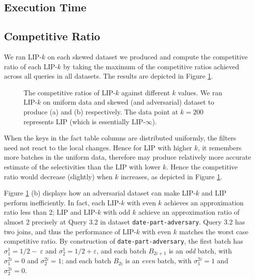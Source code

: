 \subsection{Execution Time}
\label{sec:time}



\subsection{Competitive Ratio}
\label{sec:ratio}

We ran LIP-$k$ on each skewed dataset we produced and compute the competitive ratio of each LIP-$k$ by taking the maximum of the competitive ratios achieved across all queries in all datasets. The results are depicted in Figure \ref{fig:cr}. 

\begin{figure}
    \centering
    \quad
    \caption{The competitive ratios of LIP-$k$ against different $k$ values. We ran LIP-$k$ on uniform data and skewed (and adversarial) dataset to produce (a) and (b) respectively. The data point at $k = 200$ represents LIP (which is essentially LIP-$\infty$).}
    \label{fig:cr}
\end{figure}

When the keys in the fact table columns are distributed uniformly, the filters need not react to the local changes. Hence for LIP with higher $k$, it remembers more batches in the uniform data, therefore may produce relatively more accurate estimate of the selectivities than the LIP with lower $k$. Hence the competitive ratio would decrease (slightly) when $k$ increases, as depicted in Figure \ref{fig:cr}.  

Figure \ref{fig:cr} (b) displays how an adversarial dataset can make LIP-$k$ and LIP perform inefficiently. In fact, each LIP-$k$ with even $k$ achieves an approximation ratio less than 2; LIP and LIP-$k$ with odd $k$ achieve an approximation ratio of almost 2 precisely at Query 3.2 in dataset \texttt{date-part-adversary}. Query 3.2 has two joins, and thus the performance of LIP-$k$ with even $k$ matches the worst case competitive ratio. By construction of \texttt{date-part-adversary}, the first batch has $\sigma^{1}_{1} = 1/2-\
\varepsilon$ and $\sigma^{1}_{2} = 1/2+\varepsilon$, and  each batch $B_{2i+1}$ is an \textit{odd} batch, with $\sigma^{2i}_{1} = 0$ and $\sigma^{2i}_{2} = 1$; and each batch $B_{2i}$ is an \textit{even} batch, with $\sigma^{2i}_{1} = 1$ and $\sigma^{2i}_{2} = 0$. 

